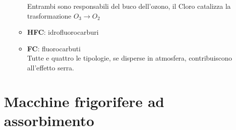 \begin{adjustwidth}{2in}{}
\begin{itemize}
\begin{itemize}
			Entrambi sono responsabili del buco dell'ozono, il Cloro catalizza la trasformazione  $O_3 \rightarrow O_2$
			
			\item \textbf{HFC}: idrofluorocarburi
			\item \textbf{FC}: fluorocarbuti\\
			
			Tutte e quattro le tipologie, se disperse in atmosfera, contribuiscono all'effetto serra.
		\end{itemize}
	\end{itemize}
\end{adjustwidth}


\newpage


\section{Macchine frigorifere ad assorbimento}
